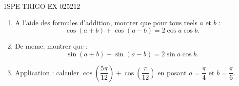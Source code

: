 \begin{exercice}{1SPE-TRIGO-EX-025}{2}{12}
\begin{enumerate}
  \item A l'aide des formules d'addition, montrer que pour tous reels $a$ et $b$ :
  \[
    \cos(a+b) + \cos(a-b) = 2\cos a \cos b.
  \]
  \item De meme, montrer que :
  \[
    \sin(a+b) + \sin(a-b) = 2\sin a \cos b.
  \]
  \item Application : calculer $\cos\!\left(\dfrac{5\pi}{12}\right) + \cos\!\left(\dfrac{\pi}{12}\right)$ en posant $a = \dfrac{\pi}{4}$ et $b = \dfrac{\pi}{6}$.
\end{enumerate}
\end{exercice}
